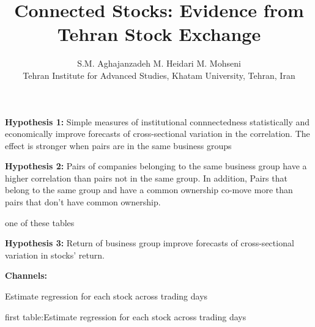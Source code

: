 \documentclass[12pt, a4paper]{article}
\title{Connected Stocks: Evidence from Tehran Stock Exchange}
\author{S.M. Aghajanzadeh\sym{*} \qquad M. Heidari\sym{*} \qquad M. Mohseni\sym{*} \\
	\sym{*} \footnotesize  Tehran Institute for Advanced Studies, Khatam University, Tehran, Iran
}
\begin{document}
	\maketitle

\textbf{Hypothesis 1:} Simple measures of institutional connnectedness statistically and economically improve forecasts of cross-sectional variation in the correlation. The effect is stronger when pairs are in the same business groups

		\begin{table}[htbp]
	\centering
	\resizebox{\textwidth}{!}{
		
	}
\end{table}

	\FloatBarrier
	\newpage
	
\textbf{Hypothesis 2:} Pairs of companies belonging to the same business group have a higher correlation than pairs not in the same group. In addition, Pairs that belong to the same group and have a common ownership co-move more than pairs that don't have common ownership. 
		\begin{table}[htbp]
	\centering
	\caption{one of these tables}
	\resizebox{\textwidth}{!}{
		
	}
\newline
\resizebox{\textwidth}{!}{
	
}
\end{table}

\newpage
\textbf{Hypothesis 3:} Return of business group improve forecasts of cross-sectional variation in stocks' return.

			\begin{table}[htbp]
		\centering
		\resizebox{\textwidth}{!}{
			
		}
	\end{table}


\newpage
\textbf{Channels:} 

\begin{table}[htbp]
	\centering
	\resizebox{\textwidth}{!}{
		
	}
\end{table}



	\begin{table}[htbp]
	\centering
	\caption{Estimate regression for
		each stock across trading days  }
	\resizebox{0.6\textheight}{!}{
		
	}
\end{table}


	\begin{table}[htbp]
	\centering
	\caption{first table:‌Estimate regression for
		each stock across trading days  }
	\resizebox{0.7\textheight}{!}{
		\centering
		
	}
\end{table}
\end{document}
